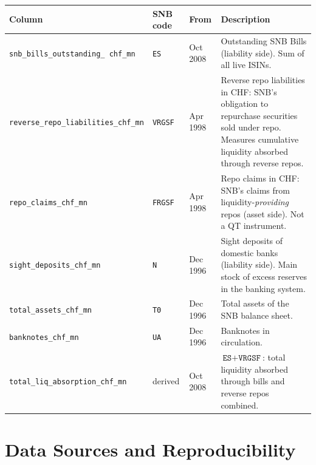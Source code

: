 \documentclass[12pt,a4paper]{article}
\begin{document}
\begin{center}
\begin{tabular}{L{4.4cm} L{2.3cm} L{2.4cm} L{4.7cm}}
  \toprule
  \textbf{Column} & \textbf{SNB code} & \textbf{From} & \textbf{Description} \\
  \midrule
  \texttt{snb\_bills\_outstanding\_ chf\_mn}      & \texttt{ES}    & Oct 2008 &
    Outstanding SNB Bills (liability side).  Sum of all live ISINs. \\[4pt]
  \texttt{reverse\_repo\_liabilities\_chf\_mn}    & \texttt{VRGSF} & Apr 1998 &
    Reverse repo liabilities in CHF: SNB's obligation to repurchase
    securities sold under repo.  Measures cumulative liquidity absorbed
    through reverse repos. \\[4pt]
  \texttt{repo\_claims\_chf\_mn}                  & \texttt{FRGSF} & Apr 1998 &
    Repo claims in CHF: SNB's claims from liquidity-\emph{providing} repos
    (asset side).  Not a QT instrument. \\[4pt]
  \texttt{sight\_deposits\_chf\_mn}               & \texttt{N}     & Dec 1996 &
    Sight deposits of domestic banks (liability side).  Main stock of
    excess reserves in the banking system. \\[4pt]
  \texttt{total\_assets\_chf\_mn}                 & \texttt{T0}    & Dec 1996 &
    Total assets of the SNB balance sheet. \\[4pt]
  \texttt{banknotes\_chf\_mn}                     & \texttt{UA}    & Dec 1996 &
    Banknotes in circulation. \\[4pt]
  \texttt{total\_liq\_absorption\_chf\_mn}        & derived        & Oct 2008 &
    $\texttt{ES} + \texttt{VRGSF}$: total liquidity absorbed through
    bills and reverse repos combined. \\
  \bottomrule
\end{tabular}
\end{center}

\section{Data Sources and Reproducibility}
\end{document}
